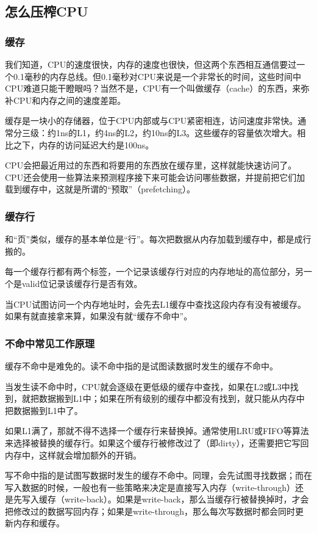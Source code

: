 \documentclass[fontset=none,aspectratio=1610]{ctexbeamer}
\begin{document}
\subsection{怎么压榨CPU}

\begin{frame}
    \frametitle{缓存}

    我们知道，CPU的速度很快，内存的速度也很快，但这两个东西相互通信要过一个0.1毫秒的内存总线。但0.1毫秒对CPU来说是一个非常长的时间，这些时间中CPU难道只能干瞪眼吗？当然不是，CPU有一个叫做缓存（cache）的东西，来弥补CPU和内存之间的速度差距。

    缓存是一块小的存储器，位于CPU内部或与CPU紧密相连，访问速度非常快。通常分三级：约1ns的L1，约4ns的L2，约10ns的L3。这些缓存的容量依次增大。相比之下，内存的访问延迟大约是100ns。

    CPU会把最近用过的东西和将要用的东西放在缓存里，这样就能快速访问了。CPU还会使用一些算法来预测程序接下来可能会访问哪些数据，并提前把它们加载到缓存中，这就是所谓的“预取”（prefetching）。

\end{frame}

\begin{frame}
    \frametitle{缓存行}

    和“页”类似，缓存的基本单位是“行”。每次把数据从内存加载到缓存中，都是成行搬的。
    
    每一个缓存行都有两个标签，一个记录该缓存行对应的内存地址的高位部分，另一个是valid位记录该缓存行是否有效。

    当CPU试图访问一个内存地址时，会先去L1缓存中查找这段内存有没有被缓存。如果有就直接拿来算，如果没有就“缓存不命中”。
\end{frame}

\begin{frame}
    \frametitle{不命中常见工作原理}

    缓存不命中是难免的。读不命中指的是试图读数据时发生的缓存不命中。
    
    当发生读不命中时，CPU就会逐级在更低级的缓存中查找，如果在L2或L3中找到，就把数据搬到L1中；如果在所有级别的缓存中都没有找到，就只能从内存中把数据搬到L1中了。

    如果L1满了，那就不得不选择一个缓存行来替换掉。通常使用LRU或FIFO等算法来选择被替换的缓存行。如果这个缓存行被修改过了（即dirty），还需要把它写回内存中，这样就会增加额外的开销。

    写不命中指的是试图写数据时发生的缓存不命中。同理，会先试图寻找数据；而在写入数据的时候，一般也有一些策略来决定是直接写入内存（write-through）还是先写入缓存（write-back）。如果是write-back，那么当缓存行被替换掉时，才会把修改过的数据写回内存；如果是write-through，那么每次写数据时都会同时更新内存和缓存。

\end{frame}
\end{document}

